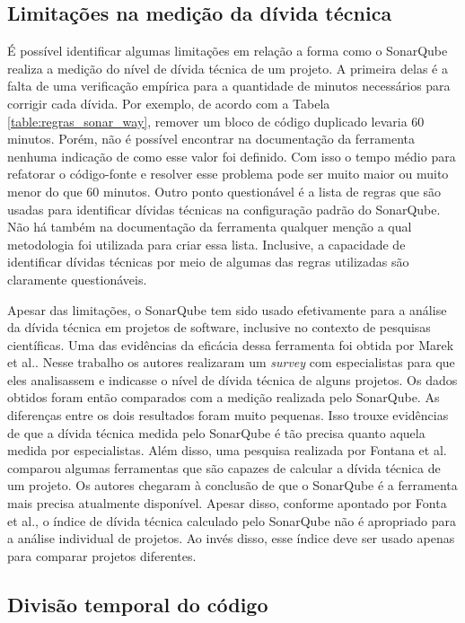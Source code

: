 \subsection{Limitações na medição da dívida técnica}


É possível identificar algumas limitações em relação a forma como o SonarQube realiza a medição do nível de dívida técnica de um projeto. A primeira delas é a falta de uma verificação empírica para a quantidade de minutos necessários para corrigir cada dívida. Por exemplo, de acordo com a Tabela \ref{table:regras_sonar_way}, remover um bloco de código duplicado levaria 60 minutos. Porém, não é possível encontrar na documentação da ferramenta nenhuma indicação de como esse valor foi definido. Com isso o tempo médio para refatorar o código-fonte e resolver esse problema pode ser muito maior ou muito menor do que 60 minutos. Outro ponto questionável é a lista de regras que são usadas para identificar dívidas técnicas na configuração padrão do SonarQube. Não há também na documentação da ferramenta qualquer menção a qual metodologia foi utilizada para criar essa lista. Inclusive, a capacidade de identificar dívidas técnicas por meio de algumas das regras utilizadas são claramente questionáveis. 

Apesar das limitações, o SonarQube tem sido usado efetivamente para a análise da dívida técnica em projetos de software, inclusive no contexto de pesquisas científicas. Uma das evidências da eficácia dessa ferramenta foi obtida por Marek et al.\cite{stochel2012value}. Nesse trabalho os autores realizaram um \textit{survey} com especialistas para que eles analisassem e indicasse o nível de dívida técnica de alguns projetos. Os dados obtidos foram então comparados com a medição realizada pelo SonarQube. As diferenças entre os dois resultados foram muito pequenas. Isso trouxe evidências de que a dívida técnica medida pelo SonarQube é tão precisa quanto aquela medida por especialistas.  Além disso, uma pesquisa realizada por Fontana et al.\cite{fontana2016tool} comparou algumas ferramentas que são capazes de calcular a dívida técnica de um projeto. Os autores chegaram à conclusão de que o SonarQube é a ferramenta mais precisa atualmente disponível. Apesar disso, conforme apontado por Fonta et al.\cite{fontana2016technical}, o índice de dívida técnica calculado pelo SonarQube não é apropriado para a análise individual de projetos. Ao invés disso, esse índice deve ser usado apenas para comparar projetos diferentes.  

\subsection{Divisão temporal do código}
 
